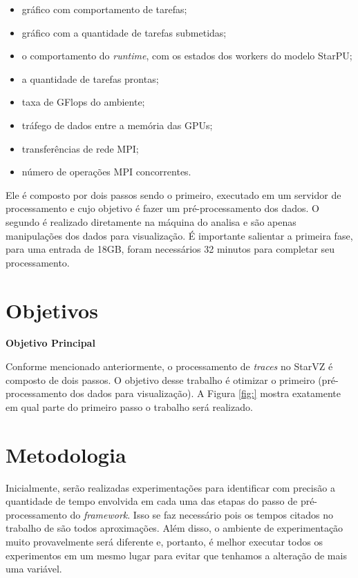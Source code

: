 \documentclass[prop-esp]{iiufrgs}
\begin{document}
\begin{itemize}
    \item gráfico com comportamento de tarefas;
    \item gráfico com a quantidade de tarefas submetidas;
    \item o comportamento do \emph{runtime}, com os estados dos workers do modelo StarPU;
    \item a quantidade de tarefas prontas;
    \item taxa de GFlops do ambiente;
    \item tráfego de dados entre a memória das GPUs;
    \item transferências de rede MPI;
    \item número de operações MPI concorrentes.
\end{itemize}

Ele é composto por dois passos sendo o primeiro, executado em um servidor de processamento e cujo objetivo é fazer um pré-processamento dos dados.
O segundo é realizado diretamente na máquina do analisa e são apenas manipulações dos dados para visualização. É importante salientar a primeira fase, para uma entrada de 18GB, foram necessários 32 minutos para completar seu processamento.


%
\chapter{Objetivos}

\noindent \textbf{Objetivo Principal} 

Conforme mencionado anteriormente, o processamento de \emph{traces} no StarVZ é composto de dois passos. O objetivo desse trabalho é otimizar o primeiro (pré-processamento dos dados para visualização). A Figura \ref{fig:} mostra exatamente em qual parte do primeiro passo o trabalho será realizado. 


%
\chapter{Metodologia}

Inicialmente, serão realizadas experimentações para identificar com precisão a quantidade de tempo
envolvida em cada uma das etapas do passo de pré-processamento do \emph{framework}. Isso se faz necessário
pois os tempos citados no trabalho de \citet{ref:starvz} são todos aproximações. Além disso, o ambiente de experimentação muito provavelmente será diferente e, portanto, é melhor executar todos os experimentos em um mesmo lugar para evitar que tenhamos a alteração de mais uma variável.
\end{document}
